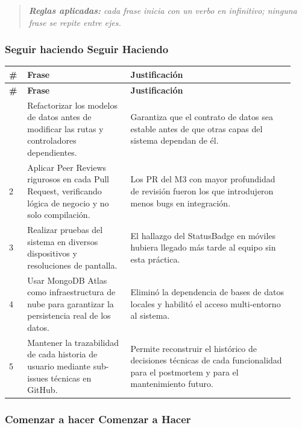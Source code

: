 \documentclass[11pt,a4paper]{article}
\begin{document}
\begin{quote}\itshape
\textbf{Reglas aplicadas:} cada frase inicia con un verbo en infinitivo; ninguna frase se repite entre ejes.\\
\end{quote}

\subsubsection{Seguir haciendo Seguir Haciendo}

\begingroup
\scriptsize
\setlength{\tabcolsep}{3pt}
\begin{longtable}{P{0.06\linewidth}P{0.34\linewidth}P{0.54\linewidth}}
\toprule
\textbf{\#} & \textbf{Frase} & \textbf{Justificación} \\
\midrule
\endfirsthead
\toprule
\textbf{\#} & \textbf{Frase} & \textbf{Justificación} \\
\midrule
\endhead
\bottomrule
{} & Refactorizar los modelos de datos antes de modificar las rutas y controladores dependientes. & Garantiza que el contrato de datos sea estable antes de que otras capas del sistema dependan de él. \\
2 & Aplicar Peer Reviews rigurosos en cada Pull Request, verificando lógica de negocio y no solo compilación. & Los PR del M3 con mayor profundidad de revisión fueron los que introdujeron menos bugs en integración. \\
3 & Realizar pruebas del sistema en diversos dispositivos y resoluciones de pantalla. & El hallazgo del StatusBadge en móviles hubiera llegado más tarde al equipo sin esta práctica. \\
4 & Usar MongoDB Atlas como infraestructura de nube para garantizar la persistencia real de los datos. & Eliminó la dependencia de bases de datos locales y habilitó el acceso multi-entorno al sistema. \\
5 & Mantener la trazabilidad de cada historia de usuario mediante sub-issues técnicas en GitHub. & Permite reconstruir el histórico de decisiones técnicas de cada funcionalidad para el postmortem y para el mantenimiento futuro. \\
\end{longtable}
\endgroup

\subsubsection{Comenzar a hacer Comenzar a Hacer}
\end{document}
